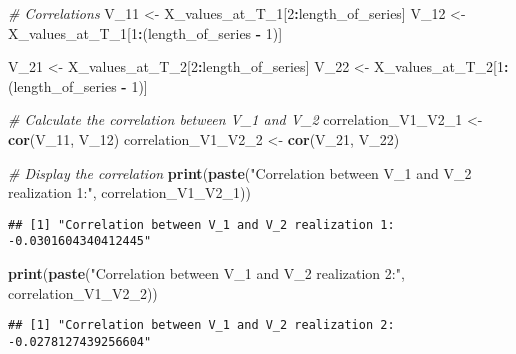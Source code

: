 \documentclass[
]{article}
\newenvironment{Shaded}{\begin{snugshade}}{\end{snugshade}}
\newcommand{\CommentTok}[1]{\textcolor[rgb]{0.56,0.35,0.01}{\textit{#1}}}
\newcommand{\DecValTok}[1]{\textcolor[rgb]{0.00,0.00,0.81}{#1}}
\newcommand{\FunctionTok}[1]{\textcolor[rgb]{0.13,0.29,0.53}{\textbf{#1}}}
\newcommand{\NormalTok}[1]{#1}
\newcommand{\OtherTok}[1]{\textcolor[rgb]{0.56,0.35,0.01}{#1}}
\newcommand{\SpecialCharTok}[1]{\textcolor[rgb]{0.81,0.36,0.00}{\textbf{#1}}}
\newcommand{\StringTok}[1]{\textcolor[rgb]{0.31,0.60,0.02}{#1}}
\begin{document}
\begin{Shaded}
\begin{Highlighting}[]
\CommentTok{\# Correlations}
\NormalTok{V\_11 }\OtherTok{\textless{}{-}}\NormalTok{ X\_values\_at\_T\_1[}\DecValTok{2}\SpecialCharTok{:}\NormalTok{length\_of\_series]}
\NormalTok{V\_12 }\OtherTok{\textless{}{-}}\NormalTok{ X\_values\_at\_T\_1[}\DecValTok{1}\SpecialCharTok{:}\NormalTok{(length\_of\_series }\SpecialCharTok{{-}} \DecValTok{1}\NormalTok{)]}

\NormalTok{V\_21 }\OtherTok{\textless{}{-}}\NormalTok{ X\_values\_at\_T\_2[}\DecValTok{2}\SpecialCharTok{:}\NormalTok{length\_of\_series]}
\NormalTok{V\_22 }\OtherTok{\textless{}{-}}\NormalTok{ X\_values\_at\_T\_2[}\DecValTok{1}\SpecialCharTok{:}\NormalTok{(length\_of\_series }\SpecialCharTok{{-}} \DecValTok{1}\NormalTok{)]}

\CommentTok{\# Calculate the correlation between V\_1 and V\_2}
\NormalTok{correlation\_V1\_V2\_1 }\OtherTok{\textless{}{-}} \FunctionTok{cor}\NormalTok{(V\_11, V\_12)}
\NormalTok{correlation\_V1\_V2\_2 }\OtherTok{\textless{}{-}} \FunctionTok{cor}\NormalTok{(V\_21, V\_22)}

\CommentTok{\# Display the correlation}
\FunctionTok{print}\NormalTok{(}\FunctionTok{paste}\NormalTok{(}\StringTok{"Correlation between V\_1 and V\_2 realization 1:"}\NormalTok{, correlation\_V1\_V2\_1))}
\end{Highlighting}
\end{Shaded}

\begin{verbatim}
## [1] "Correlation between V_1 and V_2 realization 1: -0.0301604340412445"
\end{verbatim}

\begin{Shaded}
\begin{Highlighting}[]
\FunctionTok{print}\NormalTok{(}\FunctionTok{paste}\NormalTok{(}\StringTok{"Correlation between V\_1 and V\_2 realization 2:"}\NormalTok{, correlation\_V1\_V2\_2))}
\end{Highlighting}
\end{Shaded}

\begin{verbatim}
## [1] "Correlation between V_1 and V_2 realization 2: -0.0278127439256604"
\end{verbatim}
\end{document}
